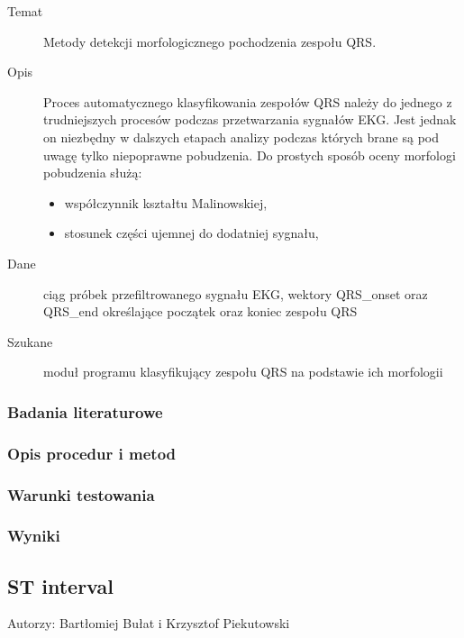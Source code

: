 \documentclass[a4paper, 11pt]{article}
\begin{document}
\begin{description}
\item[Temat] Metody detekcji morfologicznego pochodzenia zespołu QRS.
\item[Opis] Proces automatycznego klasyfikowania zespołów QRS należy do jednego z trudniejszych procesów podczas przetwarzania sygnałów EKG. Jest jednak on niezbędny w dalszych etapach analizy podczas których brane są pod uwagę tylko niepoprawne pobudzenia. Do prostych sposób oceny morfologi pobudzenia służą:
  \begin{itemize}
  \item współczynnik kształtu Malinowskiej,
  \item stosunek części ujemnej do dodatniej sygnału,
  \end{itemize}
\item[Dane] ciąg próbek przefiltrowanego sygnału EKG, wektory QRS\_onset oraz QRS\_end określające początek oraz koniec zespołu QRS
\item[Szukane] moduł programu klasyfikujący zespołu QRS na podstawie ich morfologii 
\end{description}

\subsubsection{Badania literaturowe}
\label{sec:qrs_class:papers}

\subsubsection{Opis procedur i metod}
\label{sec:qrs_class:procs}

\subsubsection{Warunki testowania}
\label{sec:qrs_class:tests}

\subsubsection{Wyniki}
\label{sec:qrs_class:results}



\subsection{ST interval}
\label{sec:st_interval}
Autorzy: Bartłomiej Bułat i Krzysztof Piekutowski
\end{document}
